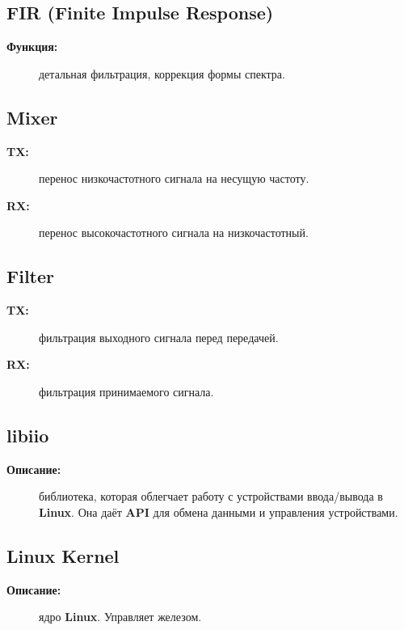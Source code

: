 \subsection*{\textbf{FIR (Finite Impulse Response)}}
\begin{description}
  \item[\textbf{Функция:}] детальная фильтрация, коррекция формы спектра.
\end{description}

\subsection*{\textbf{Mixer}}
\begin{description}
  \item[\textbf{TX:}] перенос низкочастотного сигнала на несущую частоту.
  \item[\textbf{RX:}] перенос высокочастотного сигнала на низкочастотный.
\end{description}

\subsection*{\textbf{Filter}}
\begin{description}
  \item[\textbf{TX:}] фильтрация выходного сигнала перед передачей.
  \item[\textbf{RX:}] фильтрация принимаемого сигнала.
\end{description}

\subsection*{\textbf{libiio}}
\begin{description}
  \item[\textbf{Описание:}] библиотека, которая облегчает работу с устройствами ввода/вывода в \textbf{Linux}. 
  Она даёт \textbf{API} для обмена данными и управления устройствами.
\end{description}

\subsection*{\textbf{Linux Kernel}}
\begin{description}
  \item[\textbf{Описание:}] ядро \textbf{Linux}. Управляет железом.
\end{description}

